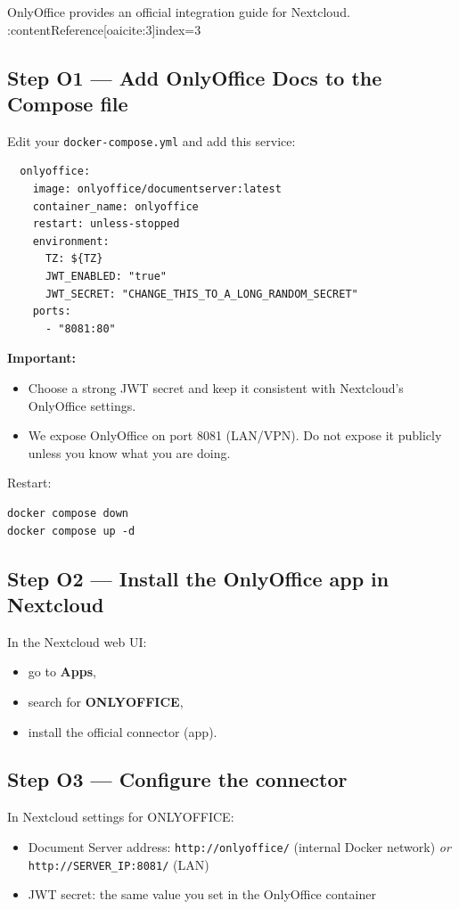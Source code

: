 OnlyOffice provides an official integration guide for Nextcloud. :contentReference[oaicite:3]{index=3}


\subsection{Step O1 --- Add OnlyOffice Docs to the Compose file}
Edit your \texttt{docker-compose.yml} and add this service:

\begin{lstlisting}
  onlyoffice:
    image: onlyoffice/documentserver:latest
    container_name: onlyoffice
    restart: unless-stopped
    environment:
      TZ: ${TZ}
      JWT_ENABLED: "true"
      JWT_SECRET: "CHANGE_THIS_TO_A_LONG_RANDOM_SECRET"
    ports:
      - "8081:80"
\end{lstlisting}

\textbf{Important:}
\begin{itemize}[leftmargin=*]
  \item Choose a strong JWT secret and keep it consistent with Nextcloud's OnlyOffice settings.
  \item We expose OnlyOffice on port 8081 (LAN/VPN). Do not expose it publicly unless you know what you are doing.
\end{itemize}

Restart:

\begin{lstlisting}
docker compose down
docker compose up -d
\end{lstlisting}

\subsection{Step O2 --- Install the OnlyOffice app in Nextcloud}
In the Nextcloud web UI:
\begin{itemize}[leftmargin=*]
  \item go to \textbf{Apps},
  \item search for \textbf{ONLYOFFICE},
  \item install the official connector (app).
\end{itemize}

\subsection{Step O3 --- Configure the connector}
In Nextcloud settings for ONLYOFFICE:
\begin{itemize}[leftmargin=*]
  \item Document Server address: \texttt{http://onlyoffice/} (internal Docker network) \emph{or} \texttt{http://SERVER\_IP:8081/} (LAN)
  \item JWT secret: the same value you set in the OnlyOffice container
\end{itemize}

